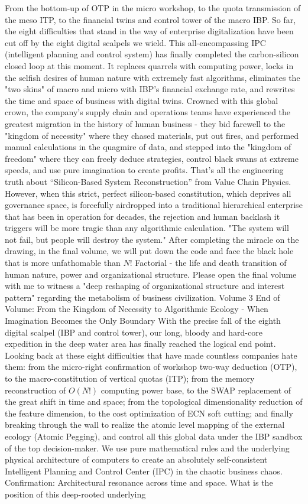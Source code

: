 \documentclass[11pt,a4paper]{article}
\begin{document}
From the bottom-up of OTP in the micro workshop, to the quota transmission of the meso ITP, to the financial twins and control tower of the macro IBP. So far, the eight difficulties that stand in the way of enterprise digitalization have been cut off by the eight digital scalpels we wield. This all-encompassing IPC (intelligent planning and control system) has finally completed the carbon-silicon closed loop at this moment. It replaces quarrels with computing power, locks in the selfish desires of human nature with extremely fast algorithms, eliminates the "two skins" of macro and micro with IBP's financial exchange rate, and rewrites the time and space of business with digital twins. Crowned with this global crown, the company's supply chain and operations teams have experienced the greatest migration in the history of human business - they bid farewell to the "kingdom of necessity" where they chased materials, put out fires, and performed manual calculations in the quagmire of data, and stepped into the "kingdom of freedom" where they can freely deduce strategies, control black swans at extreme speeds, and use pure imagination to create profits. That’s all the engineering truth about “Silicon-Based System Reconstruction” from Value Chain Physics. However, when this strict, perfect silicon-based constitution, which deprives all governance space, is forcefully airdropped into a traditional hierarchical enterprise that has been in operation for decades, the rejection and human backlash it triggers will be more tragic than any algorithmic calculation. "The system will not fail, but people will destroy the system." After completing the miracle on the drawing, in the final volume, we will put down the code and face the black hole that is more unfathomable than $N!$ Factorial - the life and death transition of human nature, power and organizational structure. Please open the final volume with me to witness a "deep reshaping of organizational structure and interest pattern" regarding the metabolism of business civilization. Volume 3 End of Volume: From the Kingdom of Necessity to Algorithmic Ecology - When Imagination Becomes the Only Boundary With the precise fall of the eighth digital scalpel (IBP and control tower), our long, bloody and hard-core expedition in the deep water area has finally reached the logical end point. Looking back at these eight difficulties that have made countless companies hate them: from the micro-right confirmation of workshop two-way deduction (OTP), to the macro-constitution of vertical quotas (ITP); from the memory reconstruction of $O(N!)$ computing power base, to the SWAP replacement of the great shift in time and space; from the topological dimensionality reduction of the feature dimension, to the cost optimization of ECN soft cutting; and finally breaking through the wall to realize the atomic level mapping of the external ecology (Atomic Pegging), and control all this global data under the IBP sandbox of the top decision-maker. We use pure mathematical rules and the underlying physical architecture of computers to create an absolutely self-consistent Intelligent Planning and Control Center (IPC) in the chaotic business chaos. Confirmation: Architectural resonance across time and space. What is the position of this deep-rooted underlying 
\end{document}
